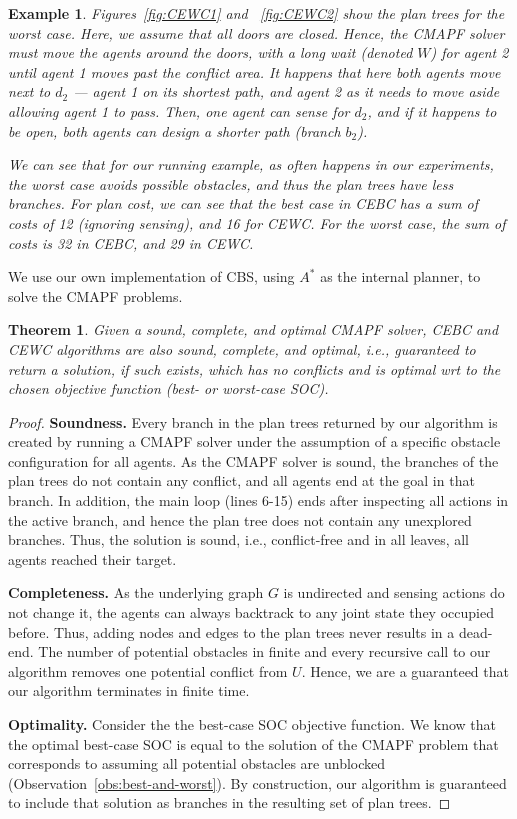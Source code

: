 \documentclass[letterpaper]{article} %
\newtheorem{exmp}{Example}
\newtheorem{theorem}{Theorem}
\begin{document}
\begin{exmp}
Figures~\ref{fig:CEWC1} and ~\ref{fig:CEWC2} show the plan trees for the worst case. Here, we assume that all doors are closed. Hence, the CMAPF solver must move the agents around the doors, with a long wait (denoted $W$) for agent 2 until agent 1 moves past the conflict area. It happens that here both agents move next to $d_2$ --- agent 1 on its shortest path, and agent 2 as it needs to move aside allowing agent 1 to pass. Then, one agent can sense for $d_2$, and if it happens to be open, both agents can design a shorter path (branch $b_2$).

We can see that for our running example, as often happens in our experiments, the worst case avoids possible obstacles, and thus the plan trees have less branches. For plan cost, we can see that the best case in CEBC has a sum of costs of 12 (ignoring sensing), and 16 for CEWC. For the worst case, the sum of costs is 32 in CEBC, and 29 in CEWC.
\end{exmp}


We use our own implementation of CBS, using $A^*$ as the internal planner, to solve the CMAPF problems.


\begin{theorem}
Given a sound, complete, and optimal CMAPF solver, CEBC and CEWC algorithms are also sound, complete, and optimal, i.e., guaranteed to return a solution, if such exists, which has no conflicts and is optimal wrt to the chosen objective function (best- or worst-case SOC).
\end{theorem}

\begin{proof}
\noindent \textbf{Soundness.}
Every branch in the plan trees returned by our algorithm is created by running a CMAPF solver under the assumption of a specific obstacle configuration for all agents.
As the CMAPF solver is sound, the branches of the plan trees do not contain any conflict, and all agents end at the goal in that branch. In addition, the main loop (lines 6-15) ends after inspecting all actions in the active branch, and hence the plan tree does not contain any unexplored branches.
Thus, the solution is sound, i.e., conflict-free and in all leaves, all agents reached their target.

\noindent\textbf{Completeness.}
As the underlying graph $G$ is undirected and sensing actions do not change it, the agents can always backtrack to any joint state they occupied before. Thus, adding nodes and edges to the plan trees never results in a dead-end.
The number of potential obstacles in finite and every recursive call to our algorithm removes one potential conflict from $U$. Hence, we are a guaranteed that our algorithm terminates in finite time.

\noindent\textbf{Optimality.} Consider the the best-case SOC objective function. We know that the optimal best-case SOC is equal to the solution of the CMAPF problem that corresponds to assuming all potential obstacles are unblocked (Observation~\ref{obs:best-and-worst}). By construction, our algorithm is guaranteed to include that solution as branches in the resulting set of plan trees.
\end{proof}
\end{document}
